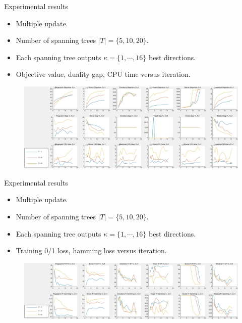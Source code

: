 \documentclass[first=dgreen,second=purple,logo=yellowexc]{aaltoslides}
\begin{document}
\begin{frame}{Experimental results}
	\begin{itemize}\footnotesize
		\item Multiple update.
		\item Number of spanning trees $|T|=\{5,10,20\}$.
		\item Each spanning tree outputs $\kappa=\{1,\cdots,16\}$ best directions.
		\item Objective value, duality gap, CPU time versus iteration.
	\end{itemize}
	\begin{figure}
		\begin{center}
			\includegraphics[scale=0.22]{./slide_overall_objective.jpg}
		\end{center}
	\end{figure}
\end{frame}

\begin{frame}{Experimental results}
	\begin{itemize}\footnotesize
		\item Multiple update.
		\item Number of spanning trees $|T|=\{5,10,20\}$.
		\item Each spanning tree outputs $\kappa=\{1,\cdots,16\}$ best directions.
		\item Training 0/1 loss, hamming loss versus iteration.
	\end{itemize}
	\begin{figure}
		\begin{center}
			\includegraphics[scale=0.22]{./slide_overall_training.jpg}
		\end{center}
	\end{figure}
\end{frame}
\end{document}
